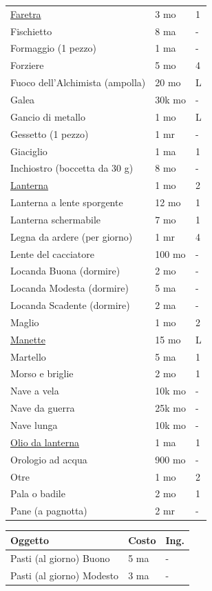 \begin{multicols}{2}
\begin{tabular}{p{5cm}p{1.5cm}p{0.7cm}}
\hyperlink{Faretra}{Faretra} & 3 mo & 1 \\
Fischietto & 8 ma & - \\
Formaggio (1 pezzo) & 1 ma & - \\
Forziere & 5 mo & 4 \\
Fuoco dell'Alchimista (ampolla) & 20 mo & L \\
Galea & 30k mo & - \\
Gancio di metallo & 1 mo & L \\
Gessetto (1 pezzo) & 1 mr & - \\
Giaciglio & 1 ma & 1 \\
Inchiostro (boccetta da 30 g) & 8 mo & - \\
\hyperlink{Lanterna}{Lanterna} & 1 mo & 2 \\
Lanterna a lente sporgente & 12 mo & 1 \\
Lanterna schermabile & 7 mo & 1 \\
Legna da ardere (per giorno) & 1 mr & 4 \\
Lente del cacciatore & 100 mo & - \\
Locanda Buona (dormire) & 2 mo & - \\
Locanda Modesta (dormire) & 5 ma & - \\
Locanda Scadente (dormire) & 2 ma & - \\
Maglio & 1 mo & 2 \\
\hyperlink{Manette}{Manette} & 15 mo & L \\
Martello & 5 ma & 1 \\
Morso e briglie & 2 mo & 1 \\
Nave a vela & 10k mo & - \\
Nave da guerra & 25k mo & - \\
Nave lunga & 10k mo & - \\
\hyperlink{Olio da lanterna}{Olio da lanterna} & 1 ma & 1 \\
Orologio ad acqua & 900 mo & - \\
Otre & 1 mo & 2 \\
Pala o badile & 2 mo & 1 \\
Pane (a pagnotta) & 2 mr & - \\
\end{tabular}
\noindent\begin{tabular}{p{5.1cm}p{1.5cm}p{0.7cm}}
\toprule
\textbf{Oggetto} & \textbf{Costo} & \textbf{Ing.} \\
\midrule
Pasti (al giorno) Buono & 5 ma & - \\
Pasti (al giorno) Modesto & 3 ma & - \\

\end{tabular}
\end{multicols}
